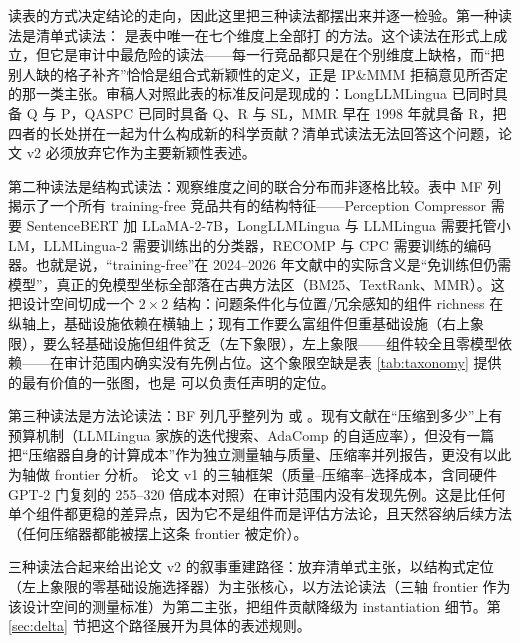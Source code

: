 读表的方式决定结论的走向，因此这里把三种读法都摆出来并逐一检验。第一种读法是清单式读法：\sieve{} 是表中唯一在七个维度上全部打 \ck{} 的方法。这个读法在形式上成立，但它是审计中最危险的读法——每一行竞品都只是在个别维度上缺格，而``把别人缺的格子补齐''恰恰是组合式新颖性的定义，正是 IP\&MMM 拒稿意见所否定的那一类主张。审稿人对照此表的标准反问是现成的：LongLLMLingua 已同时具备 Q 与 P，QASPC 已同时具备 Q、R 与 SL，MMR 早在 1998 年就具备 R，把四者的长处拼在一起为什么构成新的科学贡献？清单式读法无法回答这个问题，论文 v2 必须放弃它作为主要新颖性表述。

第二种读法是结构式读法：观察维度之间的联合分布而非逐格比较。表中 MF 列揭示了一个所有 training-free 竞品共有的结构特征——Perception Compressor 需要 SentenceBERT 加 LLaMA-2-7B，LongLLMLingua 与 LLMLingua 需要托管小 LM，LLMLingua-2 需要训练出的分类器，RECOMP 与 CPC 需要训练的编码器。也就是说，``training-free''在 2024--2026 年文献中的实际含义是``免训练但仍需模型''，真正的免模型坐标全部落在古典方法区（BM25、TextRank、MMR）。这把设计空间切成一个 $2\times 2$ 结构：问题条件化与位置/冗余感知的组件 richness 在纵轴上，基础设施依赖在横轴上；现有工作要么富组件但重基础设施（右上象限），要么轻基础设施但组件贫乏（左下象限），左上象限——组件较全且零模型依赖——在审计范围内确实没有先例占位。这个象限空缺是表 \ref{tab:taxonomy} 提供的最有价值的一张图，也是 \sieve{} 可以负责任声明的定位。

第三种读法是方法论读法：BF 列几乎整列为 \no{} 或 \partl{}。现有文献在``压缩到多少''上有预算机制（LLMLingua 家族的迭代搜索、AdaComp 的自适应率），但没有一篇把``压缩器自身的计算成本''作为独立测量轴与质量、压缩率并列报告，更没有以此为轴做 frontier 分析。\sieve{} 论文 v1 的三轴框架（质量--压缩率--选择成本，含同硬件 GPT-2 门复刻的 255--320 倍成本对照）在审计范围内没有发现先例。这是比任何单个组件都更稳的差异点，因为它不是组件而是评估方法论，且天然容纳后续方法（任何压缩器都能被摆上这条 frontier 被定价）。

三种读法合起来给出论文 v2 的叙事重建路径：放弃清单式主张，以结构式定位（左上象限的零基础设施选择器）为主张核心，以方法论读法（三轴 frontier 作为该设计空间的测量标准）为第二主张，把组件贡献降级为 instantiation 细节。第 \ref{sec:delta} 节把这个路径展开为具体的表述规则。
